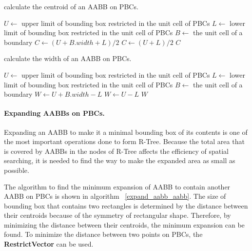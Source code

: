 \documentclass[10pt,letterpaper,twocolumn]{article}
\begin{document}
\begin{algorithm}
    \caption{calculate the centroid of an AABB on PBCs.}
    \label{centroid_aabb}
    \begin{algorithmic}
        \State $U \gets$ upper limit of bounding box restricted in the unit cell of PBCs
        \State $L \gets$ lower limit of bounding box restricted in the unit cell of PBCs
        \State $B \gets$ the unit cell of a boundary
                \State $C \gets (U + B.width + L) / 2$
            \Else
                \State $C \gets (U + L) / 2$
            \EndIf
            \State \Return $C$
        \EndFunction
     \end{algorithmic}
\end{algorithm}

\begin{algorithm}
    \caption{calculate the width of an AABB on PBCs.}
    \label{width_aabb}
    \begin{algorithmic}
        \State $U \gets$ upper limit of bounding box restricted in the unit cell of PBCs
        \State $L \gets$ lower limit of bounding box restricted in the unit cell of PBCs
        \State $B \gets$ the unit cell of a boundary
                \State $W \gets U + B.width - L$
            \Else
                \State $W \gets U - L$
            \EndIf
            \State \Return $W$
        \EndFunction
     \end{algorithmic}
\end{algorithm}

\paragraph{Expanding AABBs on PBCs.}
Expanding an AABB to make it a minimal bounding box of its contents is one of
the most important operations done to form R-Tree.
Because the total area that is covered by AABBs in the nodes of R-Tree affects
the efficiency of spatial searching, it is needed to find the way to make the
expanded area as small as possible.

The algorithm to find the minimum expansion of AABB to contain another AABB on
PBCs is shown in algorithm ~\ref{expand_aabb_aabb}.
The size of bounding box that contains two rectangles is determined by the
distance between their centroids because of the symmetry of rectangular shape.
Therefore, by minimizing the distance between their centroids, the minimum
expansion can be found. To minimize the distance between two points on PBCs,
the \textbf{RestrictVector} can be used.
\end{document}
